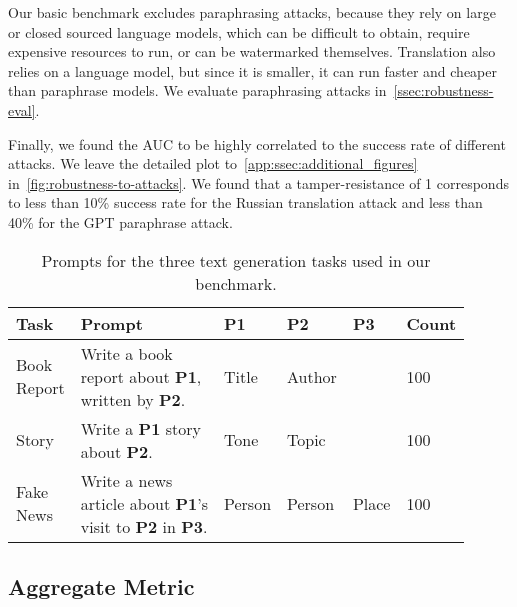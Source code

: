 Our basic benchmark excludes paraphrasing attacks, because they rely on large or closed sourced language models, which can be difficult to obtain, require expensive resources to run, or can be watermarked themselves.
Translation also relies on a language model, but since it is smaller, it can run faster and cheaper than paraphrase models. 
%
We evaluate paraphrasing attacks in~\cref{ssec:robustness-eval}.

Finally, we found the AUC to be highly correlated to the success rate of different attacks. 
We leave the detailed plot to~\cref{app:ssec:additional_figures} in~\cref{fig:robustness-to-attacks}. 
We found that a tamper-resistance of 1 corresponds to less than 10\% success rate for the Russian translation attack and less 
than 40\% for the GPT paraphrase attack. 


\renewcommand\theadalign{bl}
\renewcommand{\cellalign}{bl}

\begin{table}[t]
\centering
\caption{Prompts for the three text generation tasks used in our benchmark.}\label{tab:bench-prompts}
\begin{tabular}{|l||l|l|l|l||l|} 
\hline
\textbf{Task} & \textbf{Prompt} & \textbf{P1} & \textbf{P2} & \textbf{P3} & \textbf{Count} \\
\hline
\hline
\makecell{Book\\Report} & \makecell{Write a book\\report about \textbf{P1}, \\written by \textbf{P2}.} & Title & Author & & 100\\
\hline
Story & \makecell{Write a \textbf{P1} story\\about \textbf{P2}.} & Tone & Topic & & 100\\
\hline
\makecell{Fake\\News} & \makecell{Write a news\\article about \textbf{P1}'s \\ visit to \textbf{P2} in \textbf{P3}.} & Person & Person & Place & 100\\
\hline
\end{tabular}
\end{table}


\subsection{Aggregate Metric}\label{ssec:aggregate}


